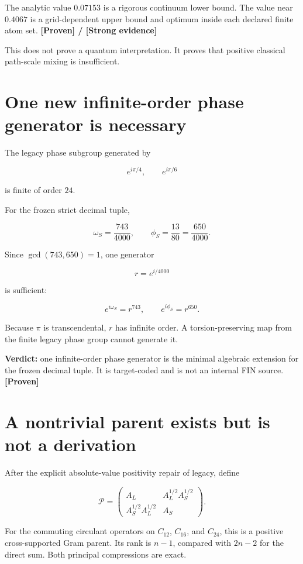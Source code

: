 \documentclass[11pt,a4paper,openany]{report}
\newcommand{\statusProven}{\textcolor{fingreen}{[Proven]}}
\newcommand{\statusStrong}{\textcolor{finblue}{[Strong evidence]}}
\begin{document}
The analytic value \(0.07153\) is a rigorous continuum lower bound. The value near \(0.4067\) is a grid-dependent upper bound and optimum inside each declared finite atom set. \textbf{\statusProven{} /\allowbreak{} \statusStrong{}}

This does not prove a quantum interpretation. It proves that positive classical path-scale mixing is insufficient.

\section{One new infinite-order phase generator is necessary}

The legacy phase subgroup generated by

\[
e^{i\pi/4},\qquad e^{i\pi/6}
\]

is finite of order \(24\).

For the frozen strict decimal tuple,

\[
\omega_S=\frac{743}{4000},
\qquad
\phi_S=\frac{13}{80}=\frac{650}{4000}.
\]

Since \(\gcd(743,650)=1\), one generator

\[
r=e^{i/4000}
\]

is sufficient:

\[
e^{i\omega_S}=r^{743},
\qquad
e^{i\phi_S}=r^{650}.
\]

Because \(\pi\) is transcendental, \(r\) has infinite order. A torsion-preserving map from the finite legacy phase group cannot generate it.

\textbf{Verdict:} one infinite-order phase generator is the minimal algebraic extension for the frozen decimal tuple. It is target-coded and is not an internal FIN source. \textbf{\statusProven{}}

\section{A nontrivial parent exists but is not a derivation}

After the explicit absolute-value positivity repair of legacy, define

\[
\mathcal P
=
\begin{pmatrix}
A_L & A_L^{1/2}A_S^{1/2}\\
A_S^{1/2}A_L^{1/2} & A_S
\end{pmatrix}.
\]

For the commuting circulant operators on \(C_{12}\), \(C_{16}\), and \(C_{24}\), this is a positive cross-supported Gram parent. Its rank is \(n-1\), compared with \(2n-2\) for the direct sum. Both principal compressions are exact.
\end{document}
